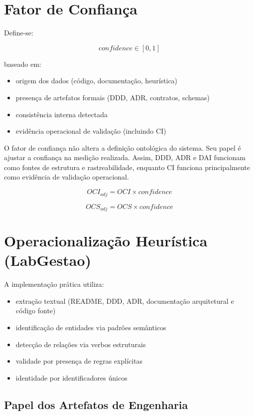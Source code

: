 \documentclass[12pt,a4paper]{article}
\begin{document}
\section{Fator de Confiança}

Define-se:

\[
confidence \in [0,1]
\]

baseado em:

\begin{itemize}
	\item origem dos dados (código, documentação, heurística)
	\item presença de artefatos formais (DDD, ADR, contratos, schemas)
	\item consistência interna detectada
	\item evidência operacional de validação (incluindo CI)
\end{itemize}

O fator de confiança não altera a definição ontológica do sistema. Seu papel é ajustar a confiança na medição realizada. Assim, DDD, ADR e DAI funcionam como fontes de estrutura e rastreabilidade, enquanto CI funciona principalmente como evidência de validação operacional.

\[
OCI_{adj} = OCI \times confidence
\]

\[
OCS_{adj} = OCS \times confidence
\]

\section{Operacionalização Heurística (LabGestao)}

A implementação prática utiliza:

\begin{itemize}
	\item extração textual (README, DDD, ADR, documentação arquitetural e código fonte)
	\item identificação de entidades via padrões semânticos
	\item detecção de relações via verbos estruturais
	\item validade por presença de regras explícitas
	\item identidade por identificadores únicos
\end{itemize}

\subsection{Papel dos Artefatos de Engenharia}
\end{document}
